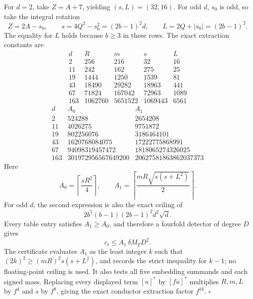 For \(d=2\), take \(Z=A+7\), yielding \((s,L)=(32,16)\).
For odd \(d\), \(s_0\) is odd, so take the integral rotation
\[
 Z=2A-s_0,\qquad
 s=4Q^2-s_0^2=(2b-1)^2d,\qquad
 L=2Q+|s_0|=(2b-1)^2.
\]
The equality for \(L\) holds because \(b\ge3\) in these rows.
The exact extraction constants are
\[
\begin{array}{c|r|r|r|r}
d&R&m&s&L\\\hline
2&256&216&32&16\\
11&242&162&275&25\\
19&1444&1250&1539&81\\
43&18490&29282&18963&441\\
67&71824&167042&72963&1089\\
163&1062760&5651522&1069443&6561
\end{array}
\]
\[
\begin{array}{c|r|r}
d&A_0&A_1\\\hline
2&524288&2654208\\
11&4026275&9751872\\
19&802256076&3186464101\\
43&1620768084075&17222775868991\\
67&94098319457472&1818065274326025\\
163&301972956567649200&20627581863862037373
\end{array}
\]
Here
\[
 A_0=\left\lceil\frac{sR^2}{4}\right\rceil,\qquad
 A_1=\left\lceil\frac{mR\sqrt{s(s+L^2)}}2\right\rceil.
\]
For odd \(d\), the second expression is also the exact ceiling of
\[
 2b^5(b-1)(2b-1)^2d^2\sqrt d.
\]
Every table entry satisfies \(A_1\ge A_0\), and therefore a
fourfold detector of degree \(D\) gives
\[
 \boxed{c_t\le A_1\,\delta M_TD^2.}                       \tag{D04.4}
\]
The certificate evaluates \(A_1\) as the least integer \(k\)
such that \((2k)^2\ge(mR)^2s(s+L^2)\), and records the strict
inequality for \(k-1\); no floating-point ceiling is used.
It also tests all five embedding summands and each signed mass.
Replacing every displayed term \([u]^*\) by \([fu]^*\) multiplies
\(R,m,L\) by \(f^4\) and \(s\) by \(f^8\), giving the exact
conductor extraction factor \(f^{16}\).
\(\square\)

